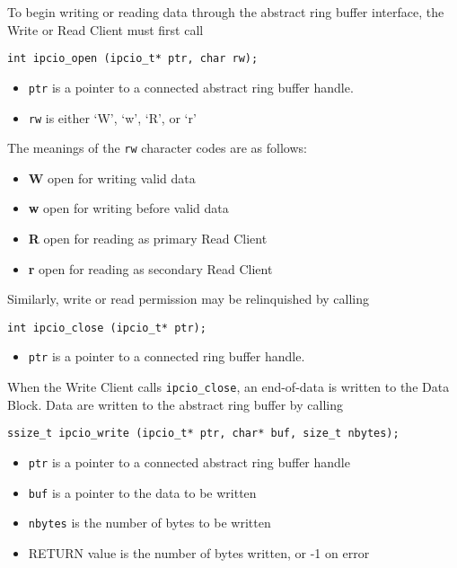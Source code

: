 To begin writing or reading data through the abstract ring buffer interface,
the Write or Read Client must first call
\begin{verbatim}
int ipcio_open (ipcio_t* ptr, char rw);
\end{verbatim}
\vspace{-6mm}
\begin{itemize}
\item {\tt ptr} is a pointer to a connected abstract ring buffer handle.
\vspace{-2mm}
\item {\tt rw} is either `W', `w', `R', or `r'
\end{itemize}
The meanings of the {\tt rw} character codes are as follows:
\begin{itemize}
\item {\bf W} open for writing valid data
\item {\bf w} open for writing before valid data
\item {\bf R} open for reading as primary Read Client
\item {\bf r} open for reading as secondary Read Client
\end{itemize}
Similarly, write or read permission may be relinquished by calling
\begin{verbatim}
int ipcio_close (ipcio_t* ptr);
\end{verbatim}
\vspace{-6mm}
\begin{itemize}
\item {\tt ptr} is a pointer to a connected ring buffer handle.
\end{itemize}
When the Write Client calls {\tt ipcio\_close}, an end-of-data is written
to the Data Block. Data are written to the abstract ring buffer by calling
\begin{verbatim}
ssize_t ipcio_write (ipcio_t* ptr, char* buf, size_t nbytes);
\end{verbatim}
\vspace{-6mm}
\begin{itemize}
\item {\tt ptr} is a pointer to a connected abstract ring buffer handle
\vspace{-2mm}
\item {\tt buf} is a pointer to the data to be written
\vspace{-2mm}
\item {\tt nbytes} is the number of bytes to be written
\vspace{-2mm}
\item RETURN value is the number of bytes written, or -1 on error
\end{itemize}
